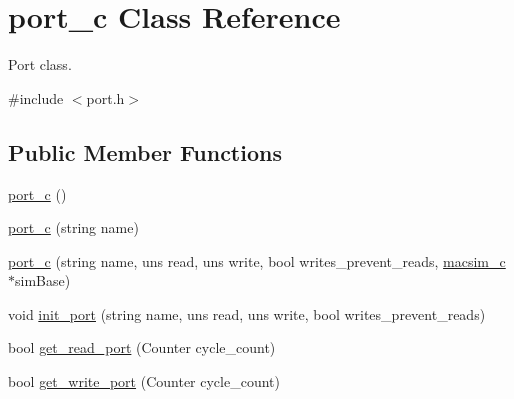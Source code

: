 \hypertarget{classport__c}{
\section{port\_\-c Class Reference}
\label{classport__c}
}


Port class.  




{\ttfamily \#include $<$port.h$>$}

\subsection*{Public Member Functions}
\begin{DoxyCompactItemize}
\item 
\hyperlink{classport__c_ad34961d8ee33d62896d925f3c83b63ce}{port\_\-c} ()
\item 
\hyperlink{classport__c_ae8e8ff9644a89aa05e45b7157f966d5e}{port\_\-c} (string name)
\item 
\hyperlink{classport__c_a8235b8a14b9e5f9574151860931a0768}{port\_\-c} (string name, uns read, uns write, bool writes\_\-prevent\_\-reads, \hyperlink{classmacsim__c}{macsim\_\-c} $\ast$simBase)
\item 
void \hyperlink{classport__c_aca9b9299a895569dcf2ce3390f902fa0}{init\_\-port} (string name, uns read, uns write, bool writes\_\-prevent\_\-reads)
\item 
bool \hyperlink{classport__c_a03435943218f4ae1d04eb762a3ff7bdb}{get\_\-read\_\-port} (Counter cycle\_\-count)
\item 
bool \hyperlink{classport__c_a10ca9d325dcf9ca7e6e7bbac2ead8e88}{get\_\-write\_\-port} (Counter cycle\_\-count)
\end{DoxyCompactItemize}

